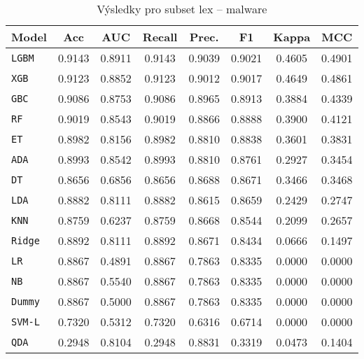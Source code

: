 \begin{table}[H]
  \centering
  \small
  \caption{Výsledky pro subset lex – malware}
  \begin{tabular}{|l|c|c|c|c|c|c|c|}
    \hline
    \textbf{Model} & \textbf{Acc} & \textbf{AUC} & \textbf{Recall} & \textbf{Prec.} & \textbf{F1} & \textbf{Kappa} & \textbf{MCC} \\
    \hline
    \texttt{LGBM} & 0.9143 & 0.8911 & 0.9143 & 0.9039 & 0.9021 & 0.4605 & 0.4901 \\
    \texttt{XGB} & 0.9123 & 0.8852 & 0.9123 & 0.9012 & 0.9017 & 0.4649 & 0.4861 \\
    \texttt{GBC} & 0.9086 & 0.8753 & 0.9086 & 0.8965 & 0.8913 & 0.3884 & 0.4339 \\
    \texttt{RF} & 0.9019 & 0.8543 & 0.9019 & 0.8866 & 0.8888 & 0.3900 & 0.4121 \\
    \texttt{ET} & 0.8982 & 0.8156 & 0.8982 & 0.8810 & 0.8838 & 0.3601 & 0.3831 \\
    \texttt{ADA} & 0.8993 & 0.8542 & 0.8993 & 0.8810 & 0.8761 & 0.2927 & 0.3454 \\
    \texttt{DT} & 0.8656 & 0.6856 & 0.8656 & 0.8688 & 0.8671 & 0.3466 & 0.3468 \\
    \texttt{LDA} & 0.8882 & 0.8111 & 0.8882 & 0.8615 & 0.8659 & 0.2429 & 0.2747 \\
    \texttt{KNN} & 0.8759 & 0.6237 & 0.8759 & 0.8668 & 0.8544 & 0.2099 & 0.2657 \\
    \texttt{Ridge} & 0.8892 & 0.8111 & 0.8892 & 0.8671 & 0.8434 & 0.0666 & 0.1497 \\
    \texttt{LR} & 0.8867 & 0.4891 & 0.8867 & 0.7863 & 0.8335 & 0.0000 & 0.0000 \\
    \texttt{NB} & 0.8867 & 0.5540 & 0.8867 & 0.7863 & 0.8335 & 0.0000 & 0.0000 \\
    \texttt{Dummy} & 0.8867 & 0.5000 & 0.8867 & 0.7863 & 0.8335 & 0.0000 & 0.0000 \\
    \texttt{SVM-L} & 0.7320 & 0.5312 & 0.7320 & 0.6316 & 0.6714 & 0.0000 & 0.0000 \\
    \texttt{QDA} & 0.2948 & 0.8104 & 0.2948 & 0.8831 & 0.3319 & 0.0473 & 0.1404 \\
    \hline
  \end{tabular}
\end{table}
\vspace{0.5cm}

